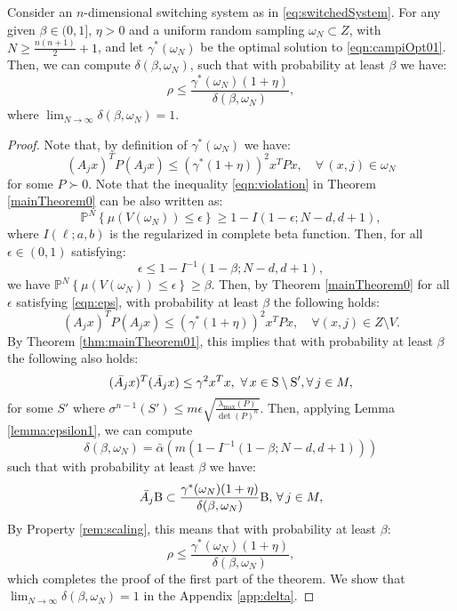 
\begin{theorem}\label{thm:mainTheorem}Consider an $n$-dimensional switching system as in \eqref{eq:switchedSystem}. For any given $\beta \in (0,1]$, $\eta > 0$ and a uniform random sampling $\omega_N \subset Z$, with $N \geq \frac{n(n+1)}{2}+1$, and let $\gamma^*(\omega_N) $ be the optimal solution to \eqref{eqn:campiOpt01}. Then, we can compute $\delta(\beta, \omega_N)$, such that with probability at least $\beta$ we have:
$$\rho \leq \frac{\gamma^*(\omega_N) (1+ \eta)}{\delta(\beta, \omega_N)},$$
where $\lim_{N \to \infty}\delta(\beta, \omega_N) = 1$.
\end{theorem}

\begin{proof}
Note that, by definition of $\gamma^*(\omega_N)$ we have:
\begin{equation*} (A_j x)^TP(A_j x) \leq {(\gamma^*(1+\eta))}^2 x^TPx, \quad \forall\, (x, j)  \in \omega_N \end{equation*}
for some $P \succ 0$. 
Note that the inequality \eqref{eqn:violation} in Theorem \ref{mainTheorem0} can be also written as:
\begin{equation}\label{eqn:violation2}\mathbb{P}^N\left\{ \mu(V(\omega_N)) \leq \epsilon \right\} \geq 1- I(1-\epsilon; N-d, d+1),\end{equation}
where $I(\ell;a,b)$ is the regularized in complete beta function. Then, for all $\epsilon \in (0,1)$ satisfying:
\begin{equation}\label{eqn:eps}\epsilon \leq 1- I^{-1}(1-\beta; N-d, d+1),\end{equation} we have $\mathbb{P}^N\left\{ \mu(V(\omega_N)) \leq \epsilon \right\} \geq \beta$.
Then, by Theorem \ref{mainTheorem0} for all $\epsilon$ satisfying \eqref{eqn:eps}, with probability at least $\beta$ the following holds:
\begin{equation*} (A_jx)^TP(A_jx) \leq  {(\gamma^*(1+\eta))}^2 x^TPx, \quad \forall (x, j) \in Z \setminus V.\end{equation*}
By Theorem \ref{thm:mainTheorem01}, this implies that with probability at least $\beta$ the following also holds:
\begin{equation*}(\bar{A_j} x)^T(\bar{A_j} x) \leq {\gamma}^2x^Tx,\,\, \forall\, x \in \text{S} \setminus \text{S}', \forall\, j \in M,\end{equation*}
for some $S'$ where $\sigma^{n-1}(S') \leq m\epsilon \sqrt{\frac{\lambda_{\max}(P)}{\det(P)^n}}.$ Then, applying Lemma \ref{lemma:epsilon1}, we can compute $$\delta(\beta, \omega_N) = \bar{\alpha}(m(1- I^{-1}(1-\beta; N-d, d+1)))$$ such that with probability at least $\beta$ we have:
\begin{equation*}
\bar{A_j} \text{B} \subset \frac{\gamma^*(\omega_N)(1+\eta)}{\delta(\beta, \omega_N)}\text{B},\, \forall\, j \in M,
\end{equation*}
By Property \ref{rem:scaling}, this means that with probability at least $\beta$:
$$\rho \leq \frac{\gamma^*(\omega_N) (1 + \eta)}{\delta(\beta, \omega_N)},$$
which completes the proof of the first part of the theorem. We show that $\lim_{N \to \infty}\delta(\beta, \omega_N) = 1$ in the Appendix \ref{app:delta}.




\end{proof}
